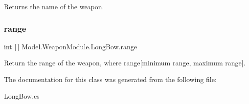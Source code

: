 Returns the name of the weapon. \hypertarget{class_model_1_1_weapon_module_1_1_long_bow_ad1c1cd55b24378a0496c669d66cfc459}{}\label{class_model_1_1_weapon_module_1_1_long_bow_ad1c1cd55b24378a0496c669d66cfc459} 
\subsubsection{\texorpdfstring{range}{range}}
{\footnotesize\ttfamily int \mbox{[}$\,$\mbox{]} Model.\+Weapon\+Module.\+Long\+Bow.\+range\hspace{0.3cm}{\ttfamily [get]}}

Return the range of the weapon, where range\mbox{[}minimum range, maximum range\mbox{]}. 

The documentation for this class was generated from the following file\+:\begin{DoxyCompactItemize}
\item 
Long\+Bow.\+cs\end{DoxyCompactItemize}
